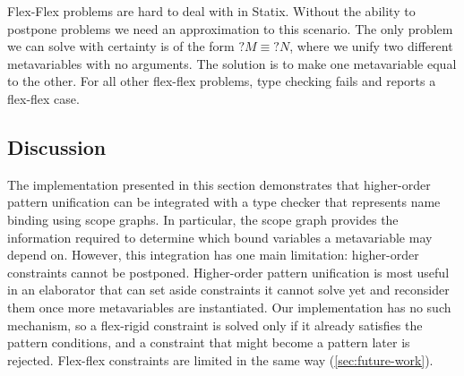 Flex-Flex problems are hard to deal with in Statix. Without the ability to postpone problems we need an approximation to this scenario. The only problem we can solve with certainty is of the form $?M \equiv ?N$, where we unify two different metavariables with no arguments. The solution is to make one metavariable equal to the other. For all other flex-flex problems, type checking fails and reports a flex-flex case.


\subsection{Discussion}
\label{sec:inference-discussion}

The implementation presented in this section demonstrates that higher-order pattern unification can be integrated with a type checker that represents name binding using scope graphs. In particular, the scope graph provides the information required to determine which bound variables a metavariable may depend on. However, this integration has one main limitation: higher-order constraints cannot be
postponed. Higher-order pattern unification is most useful in an elaborator
that can set aside constraints it cannot solve yet and reconsider them once
more metavariables are instantiated. Our implementation has no such mechanism,
so a flex-rigid constraint is solved only if it already satisfies the pattern
conditions, and a constraint that might become a pattern later is rejected.
Flex-flex constraints are limited in the same way (\cref{sec:future-work}).
